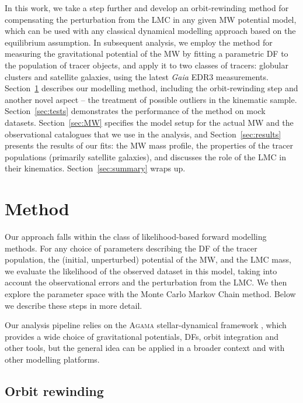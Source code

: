 \documentclass[usenatbib,fleqn]{mnras}
\newcommand{\Gaia}{\textit{Gaia}\xspace}
\begin{document}
In this work, we take a step further and develop an orbit-rewinding method for compensating the perturbation from the LMC in any given MW potential model, which can be used with any classical dynamical modelling approach based on the equilibrium assumption. In subsequent analysis, we employ the method for measuring the gravitational potential of the MW by fitting a parametric DF to the population of tracer objects, and apply it to two classes of tracers: globular clusters and satellite galaxies, using the latest \Gaia EDR3 measurements. Section~\ref{sec:method} describes our modelling method, including the orbit-rewinding step and another novel aspect -- the treatment of possible outliers in the kinematic sample.  Section~\ref{sec:tests} demonstrates the performance of the method on mock datasets. Section~\ref{sec:MW} specifies the model setup for the actual MW and the observational catalogues that we use in the analysis, and Section~\ref{sec:results} presents the results of our fits: the MW mass profile, the properties of the tracer populations (primarily satellite galaxies), and discusses the role of the LMC in their kinematics. Section~\ref{sec:summary} wraps up.


\section{Method}   \label{sec:method}

Our approach falls within the class of likelihood-based forward modelling methods. For any choice of parameters describing the DF of the tracer population, the (initial, unperturbed) potential of the MW, and the LMC mass, we evaluate the likelihood of the observed dataset in this model, taking into account the observational errors and the perturbation from the LMC. We then explore the parameter space with the Monte Carlo Markov Chain method. Below we describe these steps in more detail. 

Our analysis pipeline relies on the \textsc{Agama} stellar-dynamical framework \citep{Vasiliev2019a}, which provides a wide choice of gravitational potentials, DFs, orbit integration and other tools, but the general idea can be applied in a broader context and with other modelling platforms.

\subsection{Orbit rewinding}  \label{sec:orbit_rewinding}
\end{document}
